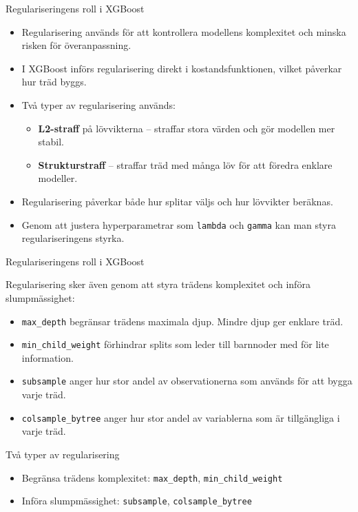 \documentclass[10pt,english]{beamer}
\begin{document}
\begin{frame}{Regulariseringens roll i XGBoost}
  \begin{itemize}
    \item Regularisering används för att kontrollera modellens komplexitet och minska risken för överanpassning.
    \item I XGBoost införs regularisering direkt i kostandsfunktionen, vilket påverkar hur träd byggs.
    \item Två typer av regularisering används:
    \begin{itemize}
      \item \textbf{L2-straff} på lövvikterna – straffar stora värden och gör modellen mer stabil.
      \item \textbf{Strukturstraff} – straffar träd med många löv för att föredra enklare modeller.
    \end{itemize}
    \item Regularisering påverkar både hur splitar väljs och hur lövvikter beräknas.
    \item Genom att justera hyperparametrar som \texttt{lambda} och \texttt{gamma} kan man styra regulariseringens styrka.
  \end{itemize}
\end{frame}

\begin{frame}{Regulariseringens roll i XGBoost}

  Regularisering sker även genom att styra trädens komplexitet
  och införa slumpmässighet:

  \begin{itemize}

    \item \texttt{max\_depth} begränsar trädens maximala djup.
          Mindre djup ger enklare träd.

    \item \texttt{min\_child\_weight} förhindrar splits som leder
          till barnnoder med för lite information.

    \item \texttt{subsample} anger hur stor andel av observationerna
          som används för att bygga varje träd.

    \item \texttt{colsample\_bytree} anger hur stor andel av
          variablerna som är tillgängliga i varje träd.

  \end{itemize}

  \vspace{0.3cm}

  \begin{block}{Två typer av regularisering}
    \begin{itemize}
      \item Begränsa trädens komplexitet:
            \texttt{max\_depth}, \texttt{min\_child\_weight}
      \item Införa slumpmässighet:
            \texttt{subsample}, \texttt{colsample\_bytree}
    \end{itemize}
  \end{block}

\end{frame}
\end{document}
